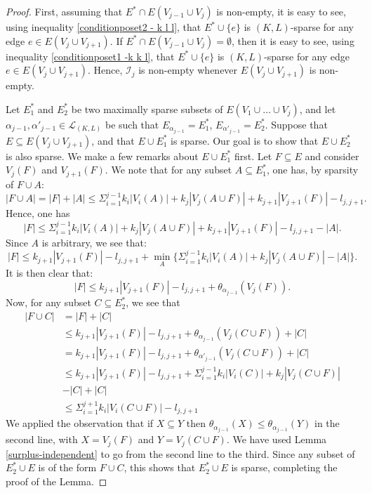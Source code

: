 \documentclass[10pt,a4paper]{article}
\begin{document}
\begin{proof}

First, assuming that $E^* \cap E(V_{j-1}\cup V_j)$ is non-empty, it is easy to see, using inequality \eqref{conditionposet2 - k l l}, that $E^* \cup \{e\}$ is $(K,L)$-sparse for any edge $e \in E(V_{j} \cup V_{j+1})$. If $E^* \cap E(V_{j-1}\cup V_j)= \emptyset$, then it is easy to see, using inequality \eqref{conditionposet1 -k k l}, that $E^* \cup \{e\}$ is $(K,L)$-sparse for any edge $e \in E(V_{j} \cup V_{j+1})$. Hence, $\mathcal{I}_j$ is non-empty whenever $E(V_{j} \cup V_{j+1})$ is non-empty.

Let $E_1^{*}$ and $E_{2}^{*}$ be two maximally sparse subsets of $E(V_1 \cup \dots \cup V_{j})$, and let $\alpha_{j-1},\alpha'_{j-1} \in \mathcal{L}_{(K,L)}$ be such that $E_{\alpha_{j-1}} = E_1^*$, $E_{\alpha'_{j-1}} = E_2^*$. Suppose that $E\subseteq E(V_{j} \cup V_{j+1})$, and that $E \cup E_1^{*}$ is sparse. Our goal is to show that $E \cup E_{2}^{*}$ is also sparse.
We make a few remarks about $E \cup E_1^{*}$ first. Let $F\subseteq E$ and consider $V_{j}(F)$ and $V_{j+1}(F)$. We note that for any subset $A \subseteq E_1^{*}$, one has, by sparsity of $F \cup A$:
\begin{equation*}
|F \cup A|=|F| +|A| \leq  \Sigma_{i=1}^{j-1}k_i |V_i(A)| + k_{j} |V_{j}(A\cup F)| +  k_{j+1} |V_{j+1}(F)| -l_{{j},{j+1}}.
\end{equation*}
Hence, one has
\begin{equation*}
|F| \leq  \Sigma_{i=1}^{j-1} k_i |V_i(A)| + k_{j} |V_{j}(A\cup F)| +  k_{j+1} |V_{j+1}(F)| -l_{{j},{j+1}} - |A|.
\end{equation*}
Since $A$ is arbitrary, we see that:
\begin{equation*}
|F| \leq   k_{j+1} |V_{j+1}(F)| -l_{j,{j+1}} + \min_{A} \{ \Sigma_{i=1}^{j-1}k_i |V_i(A)| + k_{j} |V_{j}(A\cup F)| -|A|\}.
\end{equation*}
It is then clear that: 
\begin{equation*}
|F| \leq   k_{j+1} |V_{j+1}(F)| -l_{j,{j+1}} + \theta_{\alpha_{j-1}}(V_{j}(F)).
\end{equation*}
Now, for any subset $C\subseteq E_2^{*}$, we see that
\begin{align*}
|F \cup C|&=|F| + |C| \\
&\leq  k_{j+1} |V_{j+1}(F)| -l_{j,{j+1}} + \theta_{\alpha_{j-1}}(V_{j}(C\cup F)) + |C|\\
&=   k_{j+1} |V_{j+1}(F)| -l_{j,{j+1}} + \theta_{\alpha'_{j-1}}(V_{j}(C\cup F)) + |C|\\
&\leq   k_{j+1} |V_{j+1}(F)| -l_{j,{j+1}} + \Sigma_{i=1}^{j-1} k_i|V_i(C)| + k_{j}|V_{j}(C\cup F)|\\
&- |C| + |C|\\
&\leq  \Sigma_{i=1}^{j+1} k_{i}|V_{i}(C\cup F)|-l_{j,{j+1}} 
\end{align*}
We applied the observation that if $X\subseteq Y$ then $\theta_{\alpha_{j-1}}(X) \leq \theta_{\alpha_{j-1}}(Y)$ in the second line, with $X=V_{j}(F)$ and $Y = V_{j}(C\cup F)$. We have used Lemma \ref{surplus-independent} to go from the second line to the third. Since any subset of $E_2^{*} \cup E$ is of the form $F\cup C$, this shows that $E_2^{*} \cup E$ is sparse, completing the proof of the Lemma.
\end{proof}
\end{document}
